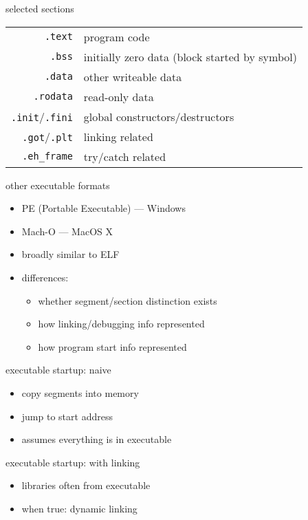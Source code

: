 \begin{frame}{selected sections}
\begin{tabular}{rl}
    {\tt .text} & program code \\
    {\tt .bss} & initially zero data {\scriptsize (block started by symbol)} \\
    {\tt .data} & other writeable data  \\
    {\tt .rodata} & read-only data \\
    {\tt .init}/{\tt .fini} & global constructors/destructors \\
    {\tt .got}/{\tt .plt} & linking related \\
    {\tt .eh\_frame} & try/catch related \\
\end{tabular}
\end{frame}

\begin{frame}{other executable formats}
    \begin{itemize}
    \item PE (Portable Executable) --- Windows
    \item Mach-O --- MacOS X
    \item broadly similar to ELF
    \item differences:  
        \begin{itemize}
        \item whether segment/section distinction exists
        \item how linking/debugging info represented
        \item how program start info represented
        \end{itemize}
    \end{itemize}
\end{frame}

\begin{frame}{executable startup: naive}
    \begin{itemize}
    \item copy segments into memory
    \item jump to start address
    \vspace{.5cm}
    \item assumes everything is in executable
    \end{itemize}
\end{frame}

\begin{frame}{executable startup: with linking}
    \begin{itemize}
    \item libraries often  from executable
    \item when true: dynamic linking
    \end{itemize}
\end{frame}

